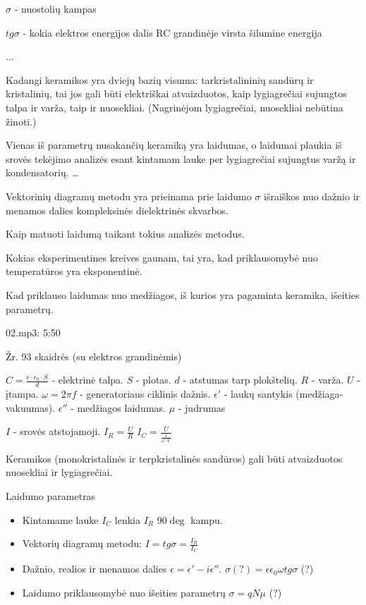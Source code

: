 $\sigma$ - nuostolių kampas

$tg\sigma$ - kokia elektros energijos dalis RC grandinėje virsta
šilumine energija

...

\begin{remember}
  \item Kadangi keramikos yra dviejų bazių visuma: tarkristalininių
    sandūrų ir kristalinių, tai jos gali būti elektriškai atvaizduotos,
    kaip lygiagrečiai sujungtos talpa ir varža, taip ir nuosekliai.
    (Nagrinėjom lygiagrečiai, nuosekliai nebūtina žinoti.)
  \item Vienas iš parametrų nusakančių keramiką yra laidumas, o laidumai
    plaukia iš srovės tekėjimo analizės esant kintamam lauke per
    lygiagrečiai sujungtus varžą ir kondensatorių. …
  \item Vektorinių diagramų metodu yra prieinama prie laidumo
    $\sigma$ išraiškos nuo dažnio ir menamos dalies kompleksinės
    dielektrinės skvarbos.
  \item Kaip matuoti laidumą taikant tokius analizės metodus.
  \item Kokias eksperimentines kreives gaunam, tai yra, kad
    priklausomybė nuo temperatūros yra eksponentinė.
  \item Kad priklauso laidumas nuo medžiagos, iš kurios yra pagaminta
    keramika, išeities parametrų.
\end{remember}


02.mp3: 5:50


Žr. 93 skaidrės (su elektros grandinėmis)

$C = \frac{\epsilon \cdot \epsilon_0 \cdot S}{d}$ - elektrinė talpa.
$S$ - plotas.
$d$ - atstumas tarp plokštelių.
$R$ - varža.
$U$ - įtampa.
$\omega = 2 \pi f$ - generatoriaus ciklinis dažnis.
$\epsilon'$ - laukų santykis (medžiaga-vakuumas).
$\epsilon''$ - medžiagos laidumas.
$\mu$ - judrumas

$I$ - srovės atstojamoji.
$I_R = \frac{U}{R}$
$I_C = \frac{U}{\frac{1}{\omega \cdot C}}$

\begin{remember}
  \item Keramikos (monokristalinės ir terpkristalinės sandūros) gali
  būti atvaizduotos nuosekliai ir lygiagrečiai.
  \item Laidumo parametras\begin{itemize}
    \item Kintamame lauke $I_C$ lenkia $I_R$ $90\deg$ kampu.
    \item Vektorių diagramų metodu: $I = tg \sigma = \frac{I_R}{I_C}$
    \item Dažnio, realios ir menamos dalies
    $\epsilon = \epsilon' - i\epsilon''$.
    $\sigma (?) = \epsilon \epsilon_0 \omega tg \sigma$ (?)
    \item Laidumo priklausomybė nuo išeities parametrų
    $\sigma = qN\mu$ (?)
  \end{itemize}
\end{remember}

